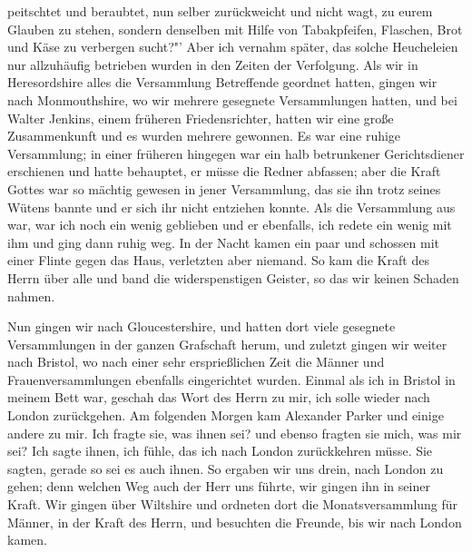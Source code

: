 peitschtet und beraubtet, nun selber zurückweicht und nicht
wagt, zu eurem Glauben zu stehen, sondern denselben mit Hilfe
von Tabakpfeifen, Flaschen, Brot und Käse zu verbergen sucht?"'
Aber ich vernahm später, das solche Heucheleien nur allzuhäufig
betrieben wurden in den Zeiten der Verfolgung.
Als wir in Heresordshire alles die Versammlung Betreffende
geordnet hatten, gingen wir nach Monmouthshire, wo wir mehrere
gesegnete Versammlungen hatten, und bei Walter Jenkins, einem
früheren Friedensrichter, hatten wir eine große Zusammenkunft
und es wurden mehrere gewonnen. Es war eine ruhige Versammlung; 
in einer früheren hingegen war ein halb betrunkener Gerichtsdiener
erschienen und hatte behauptet, er müsse die Redner abfassen; 
aber die Kraft Gottes war so mächtig gewesen in jener
Versammlung, das sie ihn trotz seines Wütens bannte und er sich
ihr nicht entziehen konnte. Als die Versammlung aus war, war
ich noch ein wenig geblieben und er ebenfalls, ich redete ein
wenig mit ihm und ging dann ruhig weg. In der Nacht kamen
ein paar und schossen mit einer Flinte gegen das Haus, verletzten
aber niemand. So kam die Kraft des Herrn über alle und
band die widerspenstigen Geister, so das wir keinen Schaden
nahmen.

Nun gingen wir nach Gloucestershire, und hatten dort viele
gesegnete Versammlungen in der ganzen Grafschaft herum, und
zuletzt gingen wir weiter nach Bristol, wo nach einer sehr 
ersprießlichen Zeit die Männer und Frauenversammlungen ebenfalls eingerichtet wurden.
Einmal als ich in Bristol in meinem Bett war, geschah das
Wort des Herrn zu mir, ich solle wieder nach London zurückgehen.
Am folgenden Morgen kam Alexander Parker und einige andere
zu mir. Ich fragte sie, was ihnen sei? und ebenso fragten sie
mich, was mir sei? Ich sagte ihnen, ich fühle, das ich nach
London zurückkehren müsse. Sie sagten, gerade so sei es auch
ihnen. So ergaben wir uns drein, nach London zu gehen; denn
welchen Weg auch der Herr uns führte, wir gingen ihn in seiner
Kraft. Wir gingen über Wiltshire und ordneten dort die 
Monatsversammlung für Männer, in der Kraft des Herrn, und besuchten
die Freunde, bis wir nach London kamen.


